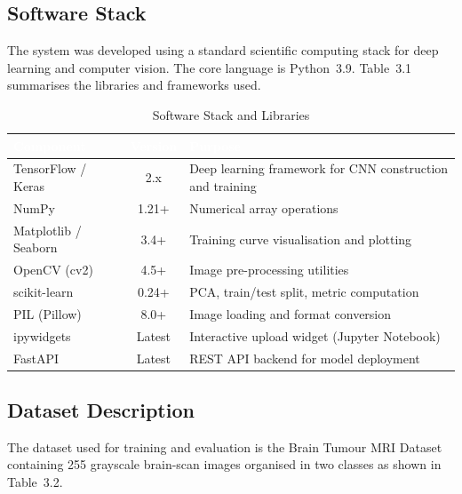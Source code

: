 \documentclass[12pt,a4paper]{article}
\begin{document}
\subsection{Software Stack}

The system was developed using a standard scientific computing stack for
deep learning and computer vision. The core language is Python~3.9.
Table~3.1 summarises the libraries and frameworks used.

\begin{table}[H]
\centering
\renewcommand{\arraystretch}{1.4}
\begin{tabular}{|l|c|p{8cm}|}
\hline
\rowcolor{black}
\textcolor{white}{\textbf{Component}} &
\textcolor{white}{\textbf{Version}} &
\textcolor{white}{\textbf{Purpose}} \\
\hline
TensorFlow / Keras  & 2.x      & Deep learning framework for CNN construction and training \\
\hline
NumPy               & 1.21+    & Numerical array operations \\
\hline
Matplotlib / Seaborn& 3.4+     & Training curve visualisation and plotting \\
\hline
OpenCV (cv2)        & 4.5+     & Image pre-processing utilities \\
\hline
scikit-learn        & 0.24+    & PCA, train/test split, metric computation \\
\hline
PIL (Pillow)        & 8.0+     & Image loading and format conversion \\
\hline
ipywidgets          & Latest   & Interactive upload widget (Jupyter Notebook) \\
\hline
FastAPI             & Latest   & REST API backend for model deployment \\
\hline
\end{tabular}
\caption{Software Stack and Libraries}
\end{table}

\FloatBarrier   %

\subsection{Dataset Description}

The dataset used for training and evaluation is the Brain Tumour MRI
Dataset containing 255 grayscale brain-scan images organised in two
classes as shown in Table~3.2.
\end{document}
